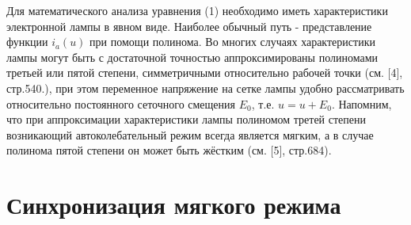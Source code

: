 \documentclass[a4paper,14pt]{extarticle}
\begin{document}
Для математического анализа уравнения (1) необходимо иметь характеристики электронной лампы в явном виде. Наиболее обычный путь - представление функции $i_a(u)$  при помощи полинома. Во многих случаях характеристики лампы могут быть с достаточной точностью аппроксимированы полиномами третьей или пятой степени, симметричными относительно рабочей точки (см. [4], стр.540.), при этом переменное напряжение на сетке лампы удобно рассматривать относительно постоянного сеточного смещения $E_0$, т.е.  $u = u +E_0$. Напомним, что при аппроксимации характеристики лампы полиномом третей степени возникающий автоколебательный режим всегда является мягким, а в случае полинома пятой степени он может быть жёстким (см. [5], стр.684).

\section{Синхронизация мягкого режима}
\end{document}
